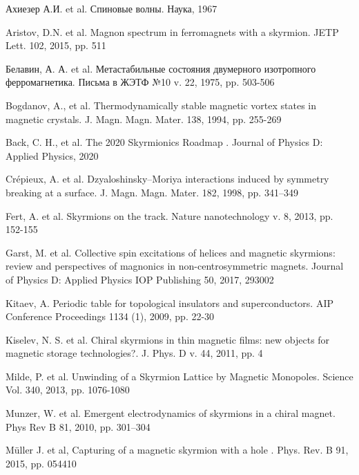 \documentclass[a4paper,article,14pt]{extarticle}
\begin{document}
\pagebreak
\begin{thebibliography}{1}
 Ахиезер А.И. et al. \flqq Спиновые волны\frqq. Наука, 1967

 Aristov, D.N. et al. \flqq Magnon spectrum in ferromagnets with a skyrmion\frqq. JETP Lett. 102, 2015, pp. 511

 Белавин, А. А. et al. \flqq Метастабильные состояния двумерного изотропного ферромагнетика\frqq. Письма в ЖЭТФ №10 v. 22, 1975, pp. 503-506

 Bogdanov, A., et al. \flqq Thermodynamically stable magnetic vortex states in magnetic crystals\frqq. J. Magn. Magn. Mater. 138, 1994, pp. 255-269
 
 Back, C. H., et al.  \flqq The 2020 Skyrmionics Roadmap \frqq. Journal of Physics D: Applied Physics, 2020

 Crépieux, A. et al. \flqq Dzyaloshinsky–Moriya interactions induced by symmetry breaking at a surface\frqq.  J. Magn. Magn. Mater. 182, 1998, pp. 341–349

 Fert, A. et al. \flqq Skyrmions on the track\frqq. Nature nanotechnology v. 8, 2013, pp. 152-155

 Garst, M. et al. \flqq Collective spin excitations of helices and magnetic skyrmions: review and perspectives of magnonics in non-centrosymmetric magnets\frqq. Journal of Physics D: Applied Physics IOP Publishing 50, 2017, 293002

 Kitaev, A. \flqq Periodic table for topological insulators and superconductors\frqq. AIP Conference Proceedings 1134 (1), 2009, pp. 22-30

 Kiselev, N. S. et al. \flqq Chiral skyrmions in thin magnetic films: new objects for magnetic storage technologies?\frqq. J. Phys. D v. 44, 2011, pp. 4

 Milde, P. et al. \flqq Unwinding of a Skyrmion Lattice by Magnetic Monopoles\frqq. Science Vol. 340, 2013, pp. 1076-1080

 Munzer, W. et al. \flqq Emergent electrodynamics of skyrmions in a chiral magnet\frqq. Phys Rev B 81, 2010, pp. 301–304

 Müller J. et al, \flqq Capturing of a magnetic skyrmion with a hole \flqq. Phys. Rev. B 91, 2015, pp. 054410


\end{thebibliography}
\end{document}
